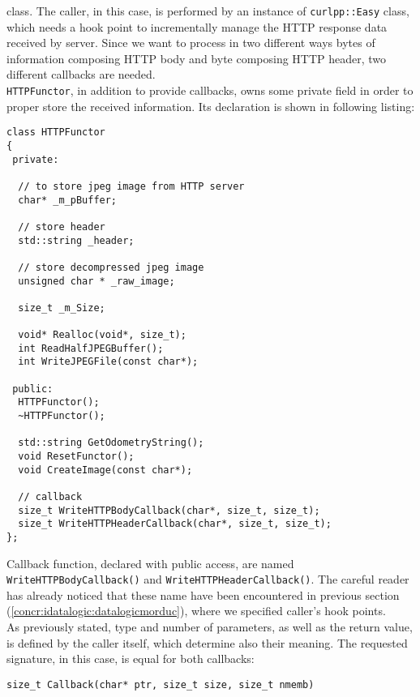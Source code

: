 class. The caller, in this case, is performed by an instance of
\texttt{curlpp::Easy} class, which needs a hook point to incrementally
manage the HTTP response data received by server. Since we want to
process in two different ways bytes of information composing HTTP body
and byte composing HTTP header, two different callbacks are needed.
\\
\texttt{HTTPFunctor}, in addition to provide callbacks, owns some
private field in order to proper store the received information. Its
declaration is shown in following listing:
\\
\begin{lstlisting}[caption={\texttt{HTTPFunctor} declaration},
    label={code:datalogiclogsimulator:httpfunctor:declaration}]
class HTTPFunctor
{
 private:

  // to store jpeg image from HTTP server
  char* _m_pBuffer;

  // store header
  std::string _header;

  // store decompressed jpeg image
  unsigned char * _raw_image;

  size_t _m_Size;

  void* Realloc(void*, size_t);
  int ReadHalfJPEGBuffer();
  int WriteJPEGFile(const char*);

 public:
  HTTPFunctor();
  ~HTTPFunctor();

  std::string GetOdometryString();
  void ResetFunctor();
  void CreateImage(const char*);

  // callback
  size_t WriteHTTPBodyCallback(char*, size_t, size_t);
  size_t WriteHTTPHeaderCallback(char*, size_t, size_t);
};
\end{lstlisting}

Callback function, declared with public access, are named
\texttt{WriteHTTPBodyCallback()} and \texttt{WriteHTTPHeaderCallback()}.
The
careful reader has already noticed that these name have been
encountered in previous section
(\ref{concr:idatalogic:datalogicmorduc}), where we specified
caller's hook points.
\\
As previously stated, type and number of parameters, as well
as the return value, is defined by the caller itself, which
determine also their meaning. The requested signature, in this
case, is equal for both callbacks:

\begin{center}
  \texttt{size\_t Callback(char* ptr, size\_t size, size\_t nmemb)}
\end{center}

